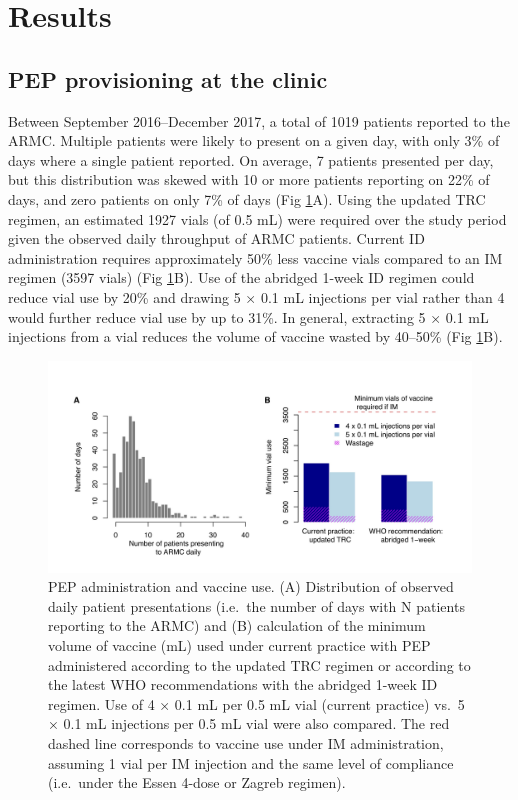 \documentclass[
  oneside]{book}
\begin{document}
\hypertarget{results}{%
\section{Results}\label{results}}

\hypertarget{pep-provisioning-at-the-clinic}{%
\subsection{PEP provisioning at the clinic}\label{pep-provisioning-at-the-clinic}}

Between September 2016--December 2017, a total of 1019 patients reported to the ARMC. Multiple patients were likely to present on a given day, with only 3\% of days where a single patient reported. On average, 7 patients presented per day, but this distribution was skewed with 10 or more patients reporting on 22\% of days, and zero patients on only 7\% of days (Fig \ref{fig:fig2}A). Using the updated TRC regimen, an estimated 1927 vials (of 0.5 mL) were required over the study period given the observed daily throughput of ARMC patients. Current ID administration requires approximately 50\% less vaccine vials compared to an IM regimen (3597 vials) (Fig \ref{fig:fig2}B). Use of the abridged 1-week ID regimen could reduce vial use by 20\% and drawing 5 × 0.1 mL injections per vial rather than 4 would further reduce vial use by up to 31\%. In general, extracting 5 × 0.1 mL injections from a vial reduces the volume of vaccine wasted by 40--50\% (Fig \ref{fig:fig2}B).

\begin{figure}
\includegraphics[width=0.95\linewidth]{figs/ch1/fig2} \caption[PEP administration and vaccine use at the Moramanga ARMC.]{PEP administration and vaccine use. (A) Distribution of observed daily patient presentations (i.e.~the number of days with N patients reporting to the ARMC) and (B) calculation of the minimum volume of vaccine (mL) used under current practice with PEP administered according to the updated TRC regimen or according to the latest WHO recommendations with the abridged 1-week ID regimen. Use of 4 × 0.1 mL per 0.5 mL vial (current practice) vs.~5 × 0.1 mL injections per 0.5 mL vial were also compared. The red dashed line corresponds to vaccine use under IM administration, assuming 1 vial per IM injection and the same level of compliance (i.e.~under the Essen 4-dose or Zagreb regimen).}\label{fig:fig2}
\end{figure}
\end{document}
